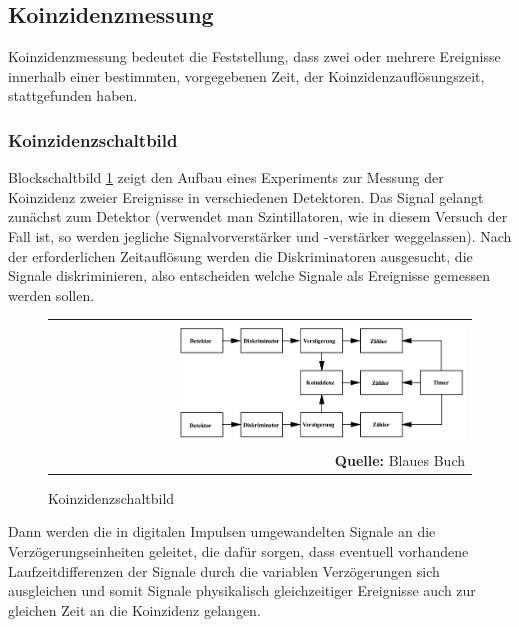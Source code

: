 \documentclass[a4paper,titlepage]{scrartcl}
\numberwithin{equation}{section}
\begin{document}
\subsection{Koinzidenzmessung}
Koinzidenzmessung bedeutet die Feststellung, dass zwei oder mehrere Ereignisse innerhalb einer bestimmten, vorgegebenen Zeit, der Koinzidenzauflösungszeit, stattgefunden haben.
\subsubsection{Koinzidenzschaltbild}
Blockschaltbild \ref{fig:koinzidenzschaltbild} zeigt den Aufbau eines Experiments zur Messung der Koinzidenz zweier Ereignisse in verschiedenen Detektoren. Das Signal gelangt zunächst zum Detektor (verwendet man Szintillatoren, wie in diesem Versuch der Fall ist, so werden jegliche Signalvorverstärker und -verstärker weggelassen). Nach der erforderlichen Zeitauflösung werden die Diskriminatoren ausgesucht, die Signale diskriminieren, also entscheiden welche Signale als Ereignisse gemessen werden sollen.
\begin{figure}[H]
	\centering
	\begin{tabular}{@{}r@{}}
		\includegraphics[width=0.7\textwidth]{images/koinzidenzmessung.PNG}\\
		\footnotesize\sffamily\textbf{Quelle:} Blaues Buch \cite{blauesBuch}
	\end{tabular}
	\caption{Koinzidenzschaltbild}
    \label{fig:koinzidenzschaltbild}
\end{figure}
Dann werden die in digitalen Impulsen umgewandelten Signale an die Verzögerungseinheiten geleitet, die dafür sorgen, dass eventuell vorhandene Laufzeitdifferenzen der Signale durch die variablen Verzögerungen sich ausgleichen und somit Signale physikalisch gleichzeitiger Ereignisse auch zur gleichen Zeit an die Koinzidenz gelangen.
\end{document}
